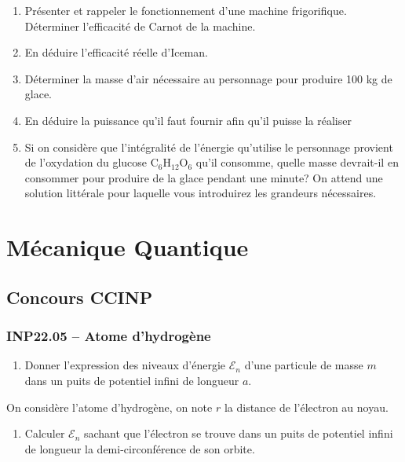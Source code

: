 \begin{enumerate}
\item Présenter et rappeler le fonctionnement d'une machine frigorifique. Déterminer l'efficacité de Carnot de la machine.
\item En déduire l'efficacité réelle d'Iceman.
\item Déterminer la masse d'air nécessaire au personnage pour produire 100 kg de glace.
\item En déduire la puissance qu'il faut fournir afin qu'il puisse la réaliser
\item Si on considère que l'intégralité de l'énergie qu'utilise le personnage provient de l'oxydation du glucose $\mathrm{C}_6 \mathrm{H}_{12} \mathrm{O}_6$ qu'il consomme, quelle masse devrait-il en consommer pour produire de la glace pendant une minute? On attend une solution littérale pour laquelle vous introduirez les grandeurs nécessaires.
\end{enumerate}

\newpage
\section*{Mécanique Quantique}

\subsection*{Concours CCINP}

\subsubsection*{INP22.05 -- Atome d'hydrogène  \lesdeux}

\begin{enumerate}
\item Donner l'expression des niveaux d'énergie $\mathcal{E}_{n}$ d'une particule de masse $m$ dans un puits de potentiel infini de longueur $a$.
\end{enumerate}

On considère l'atome d'hydrogène, on note $r$ la distance de l'électron au noyau.

\begin{enumerate}[resume]
\item Calculer $\mathcal{E}_{n}$ sachant que l'électron se trouve dans un puits de potentiel infini de longueur la demi-circonférence de son orbite.
\end{enumerate}

